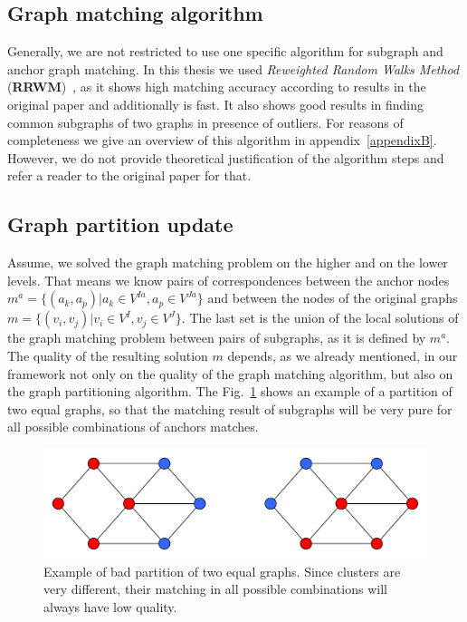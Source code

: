 \subsection{Graph matching algorithm}
Generally, we are not restricted to use one specific algorithm for subgraph and anchor graph matching. In this thesis we used \emph{Reweighted Random Walks Method} (\textbf{RRWM})~\cite{Cho2010_RRWM}, as it shows high matching accuracy according to results in the original paper and additionally is fast. It also shows good results in finding common subgraphs of two graphs in presence of outliers.
For reasons of completeness we give an overview of this algorithm in appendix~\ref{appendixB}. However, we do not provide theoretical justification of the algorithm steps and refer a reader to the original paper for that. 

\subsection{Graph partition update}
Assume, we solved the graph matching problem on the higher and on the lower levels. That means we know pairs of correspondences between the anchor nodes $m^a = \{(a_k, a_p)|a_k\in V^{Ia}, a_p\in V^{Ja}\}$ and between the nodes of the original graphs $m = \{(v_i, v_j)|v_i\in V^{I}, v_j\in V^{J}\}$. The last set is the union of the local solutions of the graph matching problem between pairs of subgraphs, as it is defined by $m^a$.
The quality of the resulting solution $m$ depends, as we already mentioned, in our framework not only on the quality of the graph matching algorithm, but also on the graph partitioning algorithm.	
The Fig.~\ref{fig:badpartition} shows an example of a partition of two equal graphs, so that the matching result of subgraphs will be very pure for all possible combinations of anchors matches.

\begin{figure}[h]
	\centering
	\includegraphics[scale=0.35]{chapter2/fig/badpartition.pdf}
	\caption[Example of bad partition of two equal graphs]{Example of bad partition of two equal graphs. Since clusters are very different, their matching in all possible combinations will always have low quality.} \label{fig:badpartition}
\end{figure}

